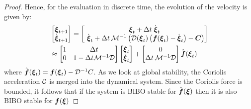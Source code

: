 \begin{proof}
Hence, for the evaluation in discrete time, the evolution of the velocity is given by:
\begin{equation}
	\begin{split}
	& \begin{bmatrix}
	 \vecs \xi_{t+1} \\ \dot{\vecs \xi}_{t+1}
	\end{bmatrix}
	=
	\begin{bmatrix}
		\vect \xi_t + \Delta t  \; \dot{\vect \xi}_t \\ \
		\dot{\vecs \xi}_t + \Delta t \, \matd{M}^{-1} \left( \matd{D}(\vect \xi_t) \left( \vect f(\vecs \xi_t) - \dot{\vecs \xi}_t \right) - \matr C \right)
	\end{bmatrix} \\
	&  \approx
	\begin{bmatrix}
		1 & \Delta t \\
		0 & 1 - \Delta t \matd{M}^{-1} \matd D 
	\end{bmatrix}
	\begin{bmatrix}
		\vect \xi_t \\ \dot{\vect \xi}_t
	\end{bmatrix}
	+ \begin{bmatrix}
		0 \\ 
		\Delta t \, \matd{M}^{-1} \matd{D} 
	\end{bmatrix}
	\hat{\vect f}(\vecs \xi_t) 
	\label{eq:discrete_time_proof}
	\end{split}
\end{equation}
where $\hat{\boldsymbol{f}}(\boldsymbol{\xi}_t) = \boldsymbol{f}(\boldsymbol{\xi}_t) - \mathcal{D}^{-1} C$. 
As we look at global stability, the Coriolis acceleration $\mathcal{C}$ is merged into the dynamical system. Since the Coriolis force is bounded, it follows that if the system is BIBO stable for $\hat{\boldsymbol{f}}(\boldsymbol{\xi})$ then it is also BIBO stable for $\boldsymbol{f}(\boldsymbol{\xi})$ 


\end{proof}
